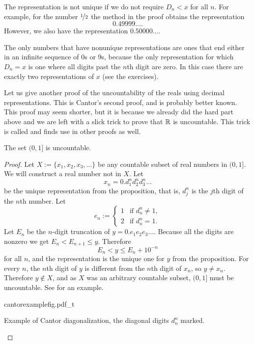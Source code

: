 The representation is not unique if we do not require
$D_n < x$ for all $n$.
For example, for the
number $\nicefrac{1}{2}$ the method in the proof obtains the representation
\begin{equation*}
0.49999\ldots .
\end{equation*}
However, we also have the representation $0.50000\ldots$.

The only numbers that have nonunique
representations are ones that end either in an infinite sequence of $0$s
or $9$s, because the only representation for which
$D_n = x$ is one where all digits past the $n$th digit are zero.  In this case
there are exactly two representations of $x$ (see the exercises).

Let us give another proof of the uncountability of the reals using decimal
representations.
This is Cantor's second proof, and is probably better known.
This proof may seem shorter, but it is because we already did
the hard part above and we are left with a slick trick to prove that ${\mathbb{R}}$ is
uncountable.  This trick is called
\emph{} and
finds use in other proofs as well.

\begin{thm}[Cantor]
The set $(0,1]$ is uncountable.
\end{thm}

\begin{proof}
Let $X := \{ x_1,x_2,x_3,\ldots \}$ be any countable subset of real numbers in $(0,1]$.
We will construct a real number not in $X$.  Let
\begin{equation*}
x_n = 0.d_1^nd_2^nd_3^n\ldots
\end{equation*}
be the unique representation from the proposition, that is, $d_j^n$ is the
$j$th digit of the $n$th number.  Let
\begin{equation*}
e_n :=
\begin{cases}
1 & \text{if } d_n^n \not= 1, \\
2 & \text{if } d_n^n = 1.
\end{cases}
\end{equation*}
Let $E_n$ be the $n$-digit truncation of $y = 0.e_1e_2e_3\ldots$.  Because
all the digits are nonzero we get $E_n < E_{n+1} \leq y$.  Therefore
\begin{equation*}
E_n < y \leq E_n + {10}^{-n} 
\end{equation*}
for all $n$, and the representation is the unique one for $y$ from 
the proposition.  For every $n$, the $n$th digit
of $y$ is different from the $n$th digit of $x_n$, so $y \not= x_n$.
Therefore $y \notin X$, and as $X$ was an arbitrary countable subset,
$(0,1]$ must be uncountable.  See  for an
example.
\begin{myfigureht}
{cantorexamplefig.pdf_t}
\caption{Example of Cantor diagonalization, the diagonal digits $d_n^n$
marked.\label{cantorexamplefig}}
\end{myfigureht}
\end{proof}

